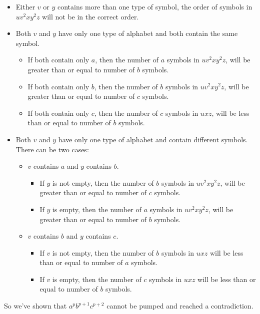 \documentclass{article}
\numberwithin{equation}{subsection}
\begin{document}
\begin{itemize}
\item Either \(v\) or \(y\) contains more than one type of symbol, the order of symbols in \(uv^2xy^2z\) will not be in the correct order.
\item Both \(v\) and \(y\) have only one type of alphabet and both contain the same symbol.
\begin{itemize}
\item If both contain only \(a\), then the number of \(a\) symbols in \(uv^2xy^2z\), will be greater than or equal to number of \(b\) symbols.
\item If both contain only \(b\), then the number of \(b\) symbols in \(uv^2xy^2z\), will be greater than or equal to number of \(c\) symbols.
\item If both contain only \(c\), then the number of \(c\) symbols in \(uxz\), will be less than or equal to number of \(b\) symbols.
\end{itemize}
\item Both \(v\) and \(y\) have only one type of alphabet and contain different symbols.
There can be two cases:
\begin{itemize}
\item \(v\) contains \(a\) and \(y\) contains \(b\).
\begin{itemize}
\item If \(y\) is not empty, then the number of \(b\) symbols in \(uv^2xy^2z\), will be greater than or equal to number of \(c\) symbols.
\item If \(y\) is empty, then the number of \(a\) symbols in \(uv^2xy^2z\), will be greater than or equal to number of \(b\) symbols.
\end{itemize}
\item \(v\) contains \(b\) and \(y\) contains \(c\).
\begin{itemize}
\item If \(v\) is not empty, then the number of \(b\) symbols in \(uxz\) will be less than or equal to number of \(a\) symbols.
\item If \(v\) is empty, then the number of \(c\) symbols in \(uxz\) will be less than or equal to number of \(b\) symbols.
\end{itemize}
\end{itemize}
\end{itemize}
So we've shown that \(a^pb^{p+1}c^{p+2}\) cannot be pumped and reached a contradiction.
\end{document}
